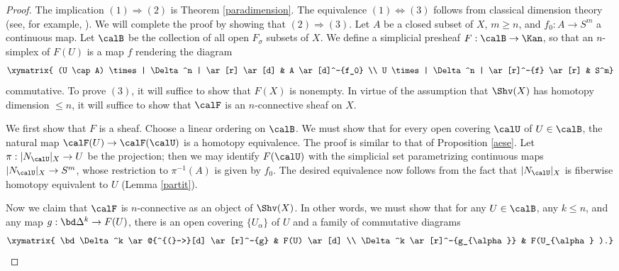 \begin{proof}
The implication $(1) \Rightarrow (2)$ is Theorem \ref{paradimension}.
The equivalence $(1) \Leftrightarrow (3)$ follows from classical dimension theory (see, for example,  \cite{dimtheory}).
We will complete the proof by showing that $(2) \Rightarrow (3)$.
Let $A$ be a closed subset of $X$, $m \geq n$, and $f_0: A \rightarrow S^m$ a continuous map.
Let $\calB$ be the collection of all open $F_{\sigma}$ subsets of $X$.
We define a simplicial presheaf $F: \calB \rightarrow \Kan$, so that an $n$-simplex of $F(U)$
is a map $f$ rendering the diagram
$$ \xymatrix{ (U \cap A) \times | \Delta^n | \ar[r] \ar[d] & A \ar[d]^-{f_0} \\
U \times | \Delta^n | \ar[r]^-{f} \ar[r] & S^m}$$ commutative. 
To prove $(3)$, it will suffice to show that $F(X)$ is nonempty. In virtue of the assumption
that $\Shv(X)$ has homotopy dimension $\leq n$, it will suffice to show that $\calF$ is an $n$-connective sheaf on $X$.

We first show that $F$ is a sheaf. Choose a linear ordering on $\calB$. We must show that
for every open covering $\calU$ of $U \in \calB$, the natural map
$\calF(U) \rightarrow \calF(\calU)$ is a homotopy equivalence. The proof is similar to that of Proposition \ref{aese}. Let $\pi: |N_{\calU}|_{X} \rightarrow U$ be the projection; then
we may identify $F(\calU)$ with the simplicial set parametrizing
continuous maps $|N_{\calU}|_{X} \rightarrow S^m$, whose restriction to $\pi^{-1}(A)$ is
given by $f_0$. The desired equivalence now follows from the fact that $|N_{\calU}|_{X}$ is fiberwise homotopy equivalent to $U$ (Lemma \ref{partit}).

Now we claim that $\calF$ is $n$-connective as an object of $\Shv(X)$. In other words, we must show that for any $U \in \calB$, any $k \leq n$, and any map $g: \bd \Delta^k \rightarrow F(U)$, there is an open covering $\{ U_{\alpha} \}$ of $U$ and a family of commutative diagrams
$$ \xymatrix{ \bd \Delta^k \ar@{^{(}->}[d] \ar[r]^-{g} & F(U) \ar[d] \\
\Delta^k \ar[r]^-{g_{\alpha}} & F(U_{\alpha} ).} $$


\end{proof}
